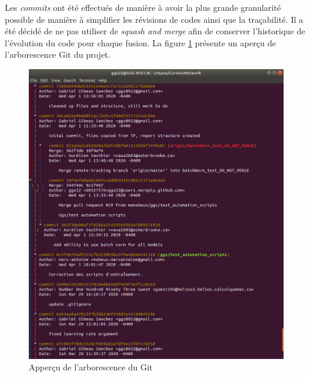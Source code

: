     Les \textit{commits} ont été effectués de manière à avoir la plus grande granularité possible de manière à simplifier les révisions de codes ainsi que la traçabilité. Il a été décidé de ne pas utiliser de \textit{squash and merge} afin de conserver l'historique de l'évolution du code pour chaque fusion. La figure \ref{fig:git_graph} présente un aperçu de l'arborescence Git du projet.
    \begin{figure}[H]
        \centering
        \includegraphics[width=15cm]{images/git_graph.png}
        \caption{Apperçu de l'arborescence du Git}
        \label{fig:git_graph}
    \end{figure}
